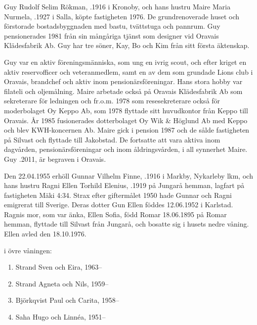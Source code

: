 %
Guy Rudolf Selim Rökman, .1916 i Kronoby, och hans hustru Maire Maria Nurmela, .1927 i Salla, köpte fastigheten 1976. De grundrenoverade huset och förstorade bostadsbyggnaden med bastu, tvättstuga och pannrum. Guy pensionerades 1981 från sin mångåriga tjänst som designer vid Oravais Klädesfabrik Ab. Guy har tre söner, Kay, Bo och Kim från sitt första äktenskap.

Guy var en aktiv föreningsmänniska, som ung en ivrig scout, och efter kriget en aktiv reservofficer och veteranmedlem, samt en av dem som 	grundade Lions club i Oravais, brandchef och aktiv inom pensionärsföreningar. Hans stora hobby var filateli och oljemålning.	Maire arbetade också på Oravais Klädesfabrik Ab som sekreterare för ledningen och fr.o.m. 1978 som resesekreterare också för moderbolaget Oy Keppo Ab, som 1978 flyttade sitt huvudkontor från Keppo till Oravais. År 1985 fusionerades dotterbolaget Oy Wik \& Höglund Ab med Keppo och blev KWH-koncernen Ab. Maire gick i pension 1987 och de sålde fastigheten på Silvast och flyttade till Jakobstad. De fortsatte att vara aktiva inom	dagvården, pensionärsföreningar och inom åldringsvården, i all synnerhet Maire. Guy .2011, är begraven i Oravais.


%
Den 22.04.1955 erhöll Gunnar Vilhelm Finne, .1916 i Markby, Nykarleby lkm, och hans hustru Ragni Ellen Torhild Elenius, .1919 på Jungarå hemman, lagfart på fastigheten Mäki 4:34. Strax efter giftermålet 1950 hade Gunnar och Ragni emigrerat till Sverige. Deras dotter Gun Ellen föddes 12.06.1952 i Karlstad. Ragnis mor, som var änka, Ellen Sofia, född Romar 18.06.1895 på Romar hemman, flyttade till Silvast från Jungarå, och bosatte sig i husets nedre våning. Ellen avled den 18.10.1976.

 i övre våningen:
\begin{enumerate}
  \item Strand Sven och Eira,	1963--
  \item Strand Agneta och Nils, 1959--
  \item Björkqvist Paul och Carita, 1958--
  \item Saha Hugo och Linnéa,	1951--
\end{enumerate}


